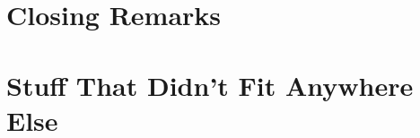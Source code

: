 \documentclass[a4paper,oneside,11pt]{book}
\begin{document}




\chapter{Closing Remarks}



\appendix
\chapter{Stuff That Didn't Fit Anywhere Else}

\printbibliography
\end{document}
